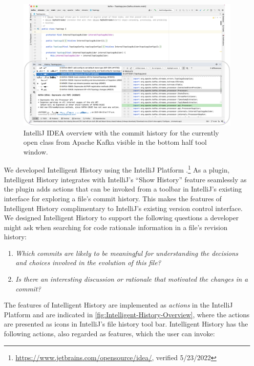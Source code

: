 \begin{figure}
    \includegraphics[width=\textwidth]{./images/intellij-overview.png}
    \caption{
        IntelliJ IDEA overview with the commit history for the currently open  class from Apache Kafka visible in the bottom half tool window.
    }
    \label{fig:IntelliJ-Overview}
\end{figure}

We developed Intelligent History using the IntelliJ Platform .\footnote{\url{https://www.jetbrains.com/opensource/idea/}, verified 5/23/2022}
As a plugin, Intelligent History integrates with IntelliJ's ``Show History'' feature seamlessly as the plugin adds actions that can be invoked from a toolbar in IntelliJ's existing interface for exploring a file's commit history. 
This makes the features of Intelligent History complimentary to IntelliJ's existing version control interface.
We designed Intelligent History to support the following questions a developer might ask when searching for code rationale information in a file's revision history:

\begin{enumerate}[label={(\arabic*)}]
    \item \textit{Which commits are likely to be meaningful for understanding the decisions and choices involved in the evolution of this file?}
    \item \textit{Is there an interesting discussion or rationale that motivated the changes in a commit?}
\end{enumerate}

The features of Intelligent History are implemented as \emph{actions} in the IntelliJ Platform  
and are indicated in \autoref{fig:Intelligent-History-Overview}, 
where the actions are presented as icons in IntelliJ's  file history tool bar.
Intelligent History has the following actions, also regarded as features, which the user can invoke:

